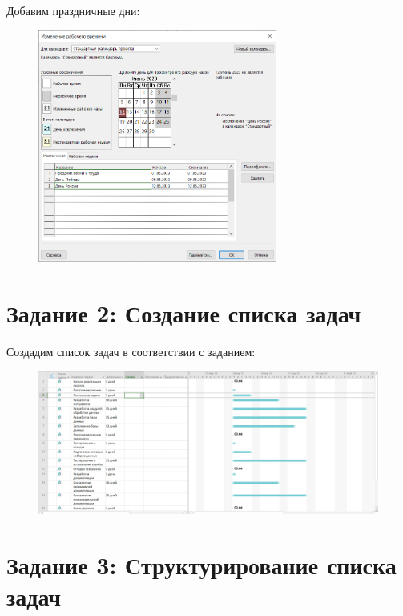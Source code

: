Добавим праздничные дни:

\begin{figure}[H]
	\begin{center}
		\includegraphics[width=0.7\textwidth]{imgs/task_1_2.png}
	\end{center}
\end{figure}

\section*{Задание 2: Создание списка задач}

Создадим список задач в соответствии с заданием:

\begin{figure}[H]
	\begin{center}
		\includegraphics[width=\textwidth]{imgs/task_2_0.png}
	\end{center}
\end{figure}

\section*{Задание 3: Структурирование списка задач}

